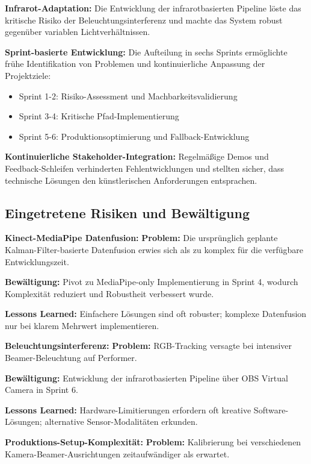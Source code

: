 \textbf{Infrarot-Adaptation:}
Die Entwicklung der infrarotbasierten Pipeline löste das kritische Risiko der Beleuchtungsinterferenz und machte das System robust gegenüber variablen Lichtverhältnissen.

\textbf{Sprint-basierte Entwicklung:}
Die Aufteilung in sechs Sprints ermöglichte frühe Identifikation von Problemen und kontinuierliche Anpassung der Projektziele:

\begin{itemize}
    \item Sprint 1-2: Risiko-Assessment und Machbarkeitsvalidierung
    \item Sprint 3-4: Kritische Pfad-Implementierung
    \item Sprint 5-6: Produktionsoptimierung und Fallback-Entwicklung
\end{itemize}

\textbf{Kontinuierliche Stakeholder-Integration:}
Regelmäßige Demos und Feedback-Schleifen verhinderten Fehlentwicklungen und stellten sicher, dass technische Lösungen den künstlerischen Anforderungen entsprachen.

\subsection{Eingetretene Risiken und Bewältigung}

\textbf{Kinect-MediaPipe Datenfusion:}
\textbf{Problem:} Die ursprünglich geplante Kalman-Filter-basierte Datenfusion erwies sich als zu komplex für die verfügbare Entwicklungszeit.

\textbf{Bewältigung:} Pivot zu MediaPipe-only Implementierung in Sprint 4, wodurch Komplexität reduziert und Robustheit verbessert wurde.

\textbf{Lessons Learned:} Einfachere Lösungen sind oft robuster; komplexe Datenfusion nur bei klarem Mehrwert implementieren.

\textbf{Beleuchtungsinterferenz:}
\textbf{Problem:} RGB-Tracking versagte bei intensiver Beamer-Beleuchtung auf Performer.

\textbf{Bewältigung:} Entwicklung der infrarotbasierten Pipeline über OBS Virtual Camera in Sprint 6.

\textbf{Lessons Learned:} Hardware-Limitierungen erfordern oft kreative Software-Lösungen; alternative Sensor-Modalitäten erkunden.

\textbf{Produktions-Setup-Komplexität:}
\textbf{Problem:} Kalibrierung bei verschiedenen Kamera-Beamer-Ausrichtungen zeitaufwändiger als erwartet.

